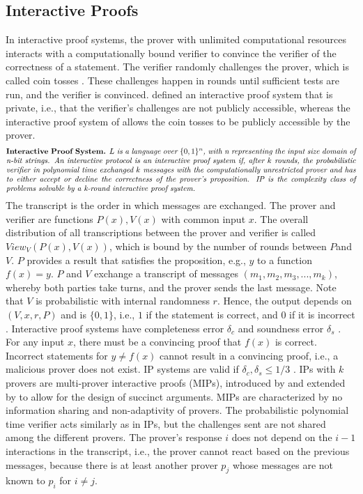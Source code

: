 \subsection{Interactive Proofs}
In interactive proof systems, the prover with unlimited computational resources interacts with a computationally bound verifier to convince the verifier of the correctness of a statement. The verifier randomly challenges the prover, which is called coin tosses \citep{GoldwasserCoinTosses}. These challenges happen in rounds until sufficient tests are run, and the verifier is convinced. \citet{GoldwasserIPs} defined an interactive proof system that is private, i.e., that the verifier's challenges are not publicly accessible, whereas the interactive proof system of \citet{BabaiIPs} allows the coin tosses to be publicly accessible by the prover.
\begin{align*}
    \text{\parbox{450pt}{\textbf{Interactive Proof System.} \textit{\(L\) is a language over \(\{0,1\}^n\), with n representing the input size domain of n-bit strings. An interactive protocol is an interactive proof system if, after \(k\) rounds, the probabilistic verifier in polynomial time exchanged \(k\) messages with the computationally unrestricted prover and has to either accept or decline the correctness of the prover's proposition. IP is the complexity class of problems solvable by a k-round interactive proof system.}}}
\end{align*}
The transcript is the order in which messages are exchanged. The prover and verifier are functions \(P(x), V(x)\) with common input \(x\). The overall distribution of all transcriptions between the prover and verifier is called \(View_V(P(x), V(x))\), which is bound by the number of rounds between \(P\)and \(V\). \(P\) provides a result that satisfies the proposition, e.g., \(y\) to a function \(f(x) = y\). \(P\) and \(V\) exchange a transcript of messages \((m_1, m_2, m_3, ..., m_k)\), whereby both parties take turns, and the prover sends the last message. Note that \(V\) is probabilistic with internal randomness \(r\). Hence, the output depends on \((V, x, r, P)\) and is \(\{0,1\}\), i.e., \(1\) if the statement is correct, and \(0\) if it is incorrect \citep{GoldwasserIPs, BabaiIPs}. Interactive proof systems have completeness error \(\delta_c\) and soundness error \(\delta_s\) . For any input \(x\), there must be a convincing proof that \(f(x)\) is correct. Incorrect statements for \(y \neq f(x)\) cannot result in a convincing proof, i.e., a malicious prover does not exist. IP systems are valid if \(\delta_c, \delta_s \leq 1/3\) \citep{Thaler}. IPs with \(k\) provers are multi-prover interactive proofs (MIPs), introduced by \citet{MIPsBen} and extended by \citet{MIPsSetty} to allow for the design of succinct arguments. MIPs are characterized by no information sharing and non-adaptivity of provers. The probabilistic polynomial time verifier acts similarly as in IPs, but the challenges sent are not shared among the different provers. The prover's response \(i\) does not depend on the \(i-1\) interactions in the transcript, i.e., the prover cannot react based on the previous messages, because there is at least another prover \(p_j\) whose messages are not known to \(p_i\) for \(i\neq j\).


